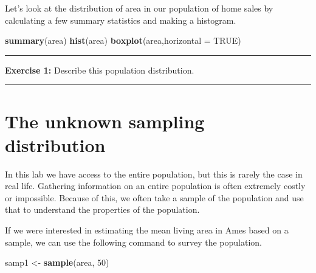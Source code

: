 \documentclass[]{book}
\newenvironment{Shaded}{\begin{snugshade}}{\end{snugshade}}
\newcommand{\DataTypeTok}[1]{\textcolor[rgb]{0.13,0.29,0.53}{#1}}
\newcommand{\DecValTok}[1]{\textcolor[rgb]{0.00,0.00,0.81}{#1}}
\newcommand{\KeywordTok}[1]{\textcolor[rgb]{0.13,0.29,0.53}{\textbf{#1}}}
\newcommand{\NormalTok}[1]{#1}
\newcommand{\OperatorTok}[1]{\textcolor[rgb]{0.81,0.36,0.00}{\textbf{#1}}}
\newcommand{\OtherTok}[1]{\textcolor[rgb]{0.56,0.35,0.01}{#1}}
\newcommand{\StringTok}[1]{\textcolor[rgb]{0.31,0.60,0.02}{#1}}
\theoremstyle{definition}
\theoremstyle{definition}
\theoremstyle{definition}
\theoremstyle{remark}
\begin{document}
\begin{Shaded}
\end{Shaded}

Let's look at the distribution of area in our population of home sales
by calculating a few summary statistics and making a histogram.

\begin{Shaded}
\begin{Highlighting}[]
\KeywordTok{summary}\NormalTok{(area)}
\KeywordTok{hist}\NormalTok{(area)}
\KeywordTok{boxplot}\NormalTok{(area,}\DataTypeTok{horizontal =} \OtherTok{TRUE}\NormalTok{)}
\end{Highlighting}
\end{Shaded}

\begin{center}\rule{0.5\linewidth}{\linethickness}\end{center}

\textbf{Exercise 1:} Describe this population distribution.

\begin{center}\rule{0.5\linewidth}{\linethickness}\end{center}

\hypertarget{the-unknown-sampling-distribution}{%
\section{The unknown sampling
distribution}\label{the-unknown-sampling-distribution}}

In this lab we have access to the entire population, but this is rarely
the case in real life. Gathering information on an entire population is
often extremely costly or impossible. Because of this, we often take a
sample of the population and use that to understand the properties of
the population.

If we were interested in estimating the mean living area in Ames based
on a sample, we can use the following command to survey the population.

\begin{Shaded}
\begin{Highlighting}[]
\NormalTok{samp1 <-}\StringTok{ }\KeywordTok{sample}\NormalTok{(area, }\DecValTok{50}\NormalTok{)}
\end{Highlighting}
\end{Shaded}
\end{document}

